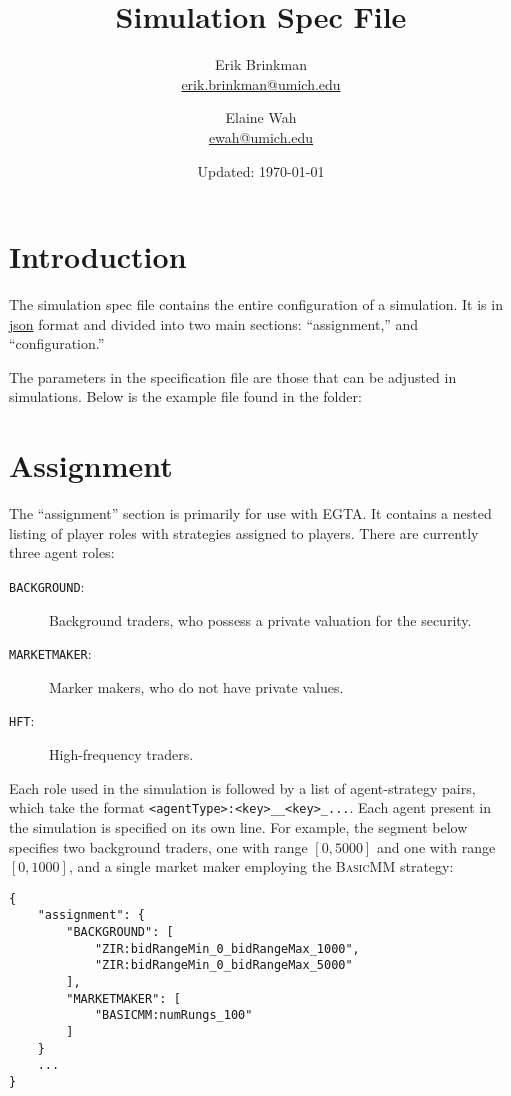 \documentclass[11pt]{article}
\begin{document}
	
\title{Simulation Spec File}
\author{
  Erik Brinkman \\
  \href{mailto:erik.brinkman@umich.edu}{erik.brinkman@umich.edu}
  \and
  Elaine Wah \\
  \href{mailto:ewah@umich.edu}{ewah@umich.edu}
}
\date{Updated: \today}
\maketitle

\section{Introduction}

The simulation spec file contains the entire configuration of a simulation. It
is in \href{https://en.wikipedia.org/wiki/Json}{json} format and divided into
two main sections: ``assignment,'' and ``configuration.''

The parameters in the specification file are those that can be adjusted in
simulations. Below is the example  file found in
the  folder:



\section{Assignment}

The ``assignment'' section is primarily for use with EGTA. It contains a
nested listing of player roles with strategies assigned to players. 
%
There are currently three agent roles:
 \begin{description}
  \item[\texttt{BACKGROUND}:] Background traders, who possess a private valuation for the security.
  \item[\texttt{MARKETMAKER}:] Marker makers, who do not have private values.
  \item[\texttt{HFT}:] High-frequency traders.
  \end{description}

Each role used in the simulation is followed by a list of agent-strategy pairs, which take the format \texttt{<agentType>:<key>\_<value1>\_<key>\_<value2>...}. Each agent present in the simulation is specified on its own line.
%
For example, the segment below specifies two background traders, one with range $[0, 5000]$ and one with range $[0, 1000]$, and a single market maker employing the \textsc{BasicMM} strategy:
%
\begin{verbatim}
{
    "assignment": {
        "BACKGROUND": [
            "ZIR:bidRangeMin_0_bidRangeMax_1000",
            "ZIR:bidRangeMin_0_bidRangeMax_5000"
        ],
        "MARKETMAKER": [
            "BASICMM:numRungs_100"
        ]
    }
    ...
}
\end{verbatim}
\end{document}
